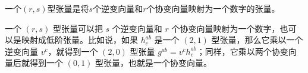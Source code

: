 
\begin{definition}{}
一个$(r, s)$型张量是将$s$个逆变向量和$r$个协变向量映射为一个数字的张量。
\end{definition}

一个 $(r, s)$ 型张量可以把 $s$ 个逆变向量和 $r$ 个协变向量映射为一个数字，也可以是映射成低阶张量。比如说，如果 $h^{ab}_c$ 是一个 $(2, 1)$ 型张量，那么它乘以一个逆变向量 $v^c$，就得到一个 $(2, 0)$ 型张量 $g^{ab}=v^ch^{ab}_c$；同样，它乘以两个协变向量后就得到一个 $(0, 1)$ 型张量，也就是一个协变向量。













